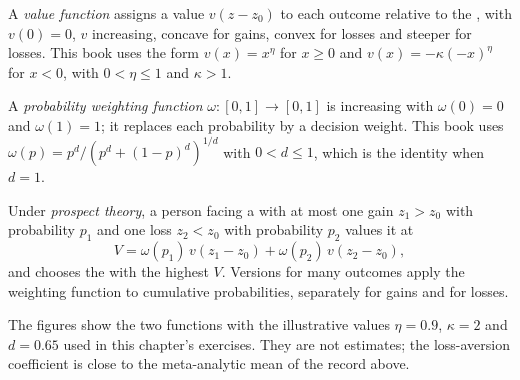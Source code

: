 \begin{definition}\label{def:b2:behavioural-evidence:value-function}
A \emph{value function} assigns a value $v(z - z_0)$ to each
outcome relative to the , with $v(0) = 0$, $v$ increasing, concave for gains, convex for
losses and steeper for losses. This book uses the form $v(x) = x^{\eta}$ for $x \ge 0$ and $v(x) =
-\kappa(-x)^{\eta}$ for $x < 0$, with $0 < \eta \le 1$ and $\kappa > 1$.
\end{definition}

\begin{definition}\label{def:b2:behavioural-evidence:weighting}
A \emph{probability weighting function} $\omega : [0, 1] \to [0,
1]$ is increasing with $\omega(0) = 0$ and $\omega(1) = 1$; it replaces each probability by a decision
weight. This book uses $\omega(p) = p^{d}/(p^{d} + (1 - p)^{d})^{1/d}$ with $0 < d \le 1$, which is the
identity when $d = 1$.
\end{definition}

\begin{definition}\label{def:b2:behavioural-evidence:prospect-theory}
Under \emph{prospect theory}, a person facing a  with at most one gain
$z_1 > z_0$ with probability $p_1$ and one loss $z_2 < z_0$ with probability $p_2$ values it at
\[
V = \omega(p_1)\,v(z_1 - z_0) + \omega(p_2)\,v(z_2 - z_0),
\]
and chooses the  with the highest $V$. Versions for many outcomes apply the weighting function to
cumulative probabilities, separately for gains and for losses.
\end{definition}

The figures show the two functions with the illustrative values $\eta = 0.9$, $\kappa = 2$ and $d =
0.65$ used in this chapter's exercises. They are not estimates; the loss-aversion coefficient is close to
the meta-analytic mean of the record above.

